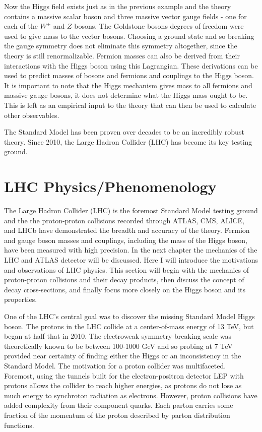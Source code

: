 Now the Higgs field exists just as in the previous example and the theory contains a massive scalar boson and three massive vector gauge fields - one for each of the $W^\pm$ and $Z$ bosons. The Goldstone bosons degrees of freedom were used to give mass to the vector bosons. Choosing a ground state and so breaking the gauge symmetry does not eliminate this symmetry altogether, since the theory is still renormalizable. Fermion masses can also be derived from their interactions with the Higgs boson using this Lagrangian. These derivations can be used to predict masses of bosons and fermions and couplings to the Higgs boson. It is important to note that the Higgs mechanism gives mass to all fermions and massive gauge bosons, it does not determine what the Higgs mass ought to be. This is left as an empirical input to the theory that can then be used to calculate other observables. 

The Standard Model has been proven over decades to be an incredibly robust theory. Since 2010, the Large Hadron Collider (LHC) has become its key testing ground. 

\section{LHC Physics/Phenomenology}
The Large Hadron Collider (LHC) is the foremost Standard Model testing ground and the the proton-proton collisions recorded through ATLAS, CMS, ALICE, and LHCb have demonstrated the breadth and accuracy of the theory. Fermion and gauge boson masses and couplings, including the mass of the Higgs boson, have been measured with high precision. In the next chapter the mechanics of the LHC and ATLAS detector will be discussed. Here I will introduce the motivations and observations of LHC physics. This section will begin with the mechanics of proton-proton collisions and their decay products, then discuss the concept of decay cross-sections, and finally focus more closely on the Higgs boson and its properties.

One of the LHC's central goal was to discover the missing Standard Model Higgs boson. The protons in the LHC collide at a center-of-mass energy of 13 TeV, but began at half that in 2010. The electroweak symmetry breaking scale was theoretically known to be between 100-1000 GeV and so probing at 7 TeV provided near certainty of finding either the Higgs or an inconsistency in the Standard Model. The motivation for a proton collider was multifaceted. Foremost, using the tunnels built for the electron-positron detector LEP with protons allows the collider to reach higher energies, as protons do not lose as much energy to synchroton radiation as electrons. However, proton collisions have added complexity from their component quarks. Each parton carries some fraction of the momentum of the proton described by parton distribution functions. 

